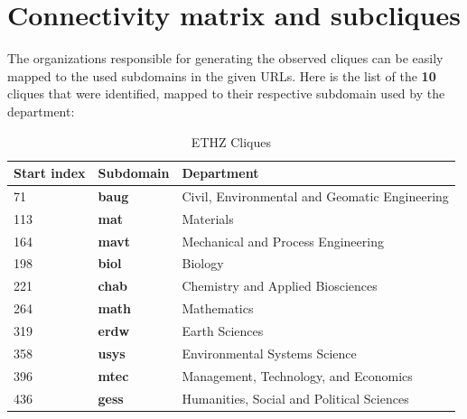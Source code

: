 \documentclass[unicode,11pt,a4paper,oneside,numbers=endperiod,openany]{scrartcl}
\begin{document}
\section{Connectivity matrix and subcliques }
The organizations responsible for generating the observed cliques can be easily mapped to the used subdomains in the given URLs. Here is the list of the \textbf{10} cliques that were identified, mapped to their respective subdomain used by the department:

\vspace{1em}

\begin{table}[h]
    \centering
    \begin{tabular}{lll}
        \toprule
        \textbf{Start index} & \textbf{Subdomain} & \textbf{Department} \\
        \midrule
        71 & \textbf{baug} & Civil, Environmental and Geomatic Engineering \\
        113 & \textbf{mat} & Materials \\
        164 & \textbf{mavt} & Mechanical and Process Engineering \\
        198 & \textbf{biol} & Biology \\
        221 & \textbf{chab} & Chemistry and Applied Biosciences \\
        264 & \textbf{math} & Mathematics \\
        319 & \textbf{erdw} & Earth Sciences \\
        358 & \textbf{usys} & Environmental Systems Science \\
        396 & \textbf{mtec} & Management, Technology, and Economics \\
        436 & \textbf{gess} & Humanities, Social and Political Sciences \\
        \bottomrule
    \end{tabular}
    \caption{ETHZ Cliques}
\end{table}
\end{document}
